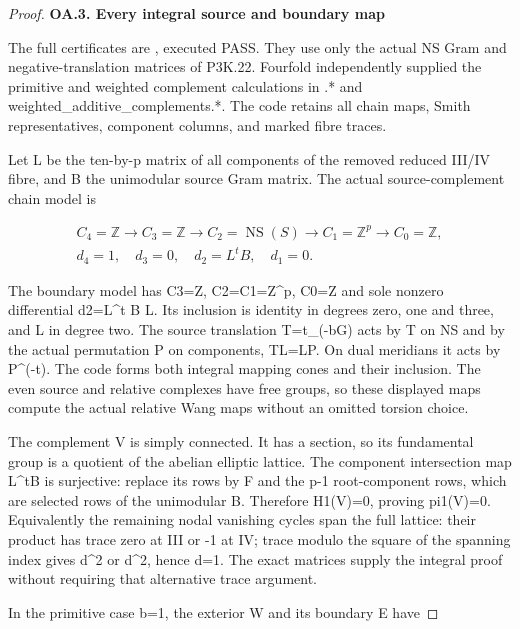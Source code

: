 \begin{proof}
\par

\medskip\noindent\textbf{OA.3. Every integral source and boundary map}

The full certificates are
, executed PASS.
They use only the actual NS Gram and negative-translation matrices
of P3K.22. Fourfold independently supplied the primitive and
weighted complement calculations in
.* and
weighted\_additive\_complements.*. The code retains all chain maps,
Smith representatives, component columns, and marked fibre traces.

Let L be the ten-by-p matrix of all components of the removed
reduced III/IV fibre, and B the unimodular source Gram matrix.
The actual source-complement chain model is

\[
\begin{gathered}C_4=\mathbb Z\longrightarrow C_3=\mathbb Z\longrightarrow C_2=\operatorname{NS}(S)\longrightarrow C_1=\mathbb Z^p\longrightarrow C_0=\mathbb Z,\\ d_4=1,\quad d_3=0,\quad d_2=L^tB,\quad d_1=0.\end{gathered}
\]

The boundary model has C3=Z, C2=C1=Z\^{}p, C0=Z and sole
nonzero differential d2=L\^{}t B L. Its inclusion is identity
in degrees zero, one and three, and L in degree two.
The source translation T=t\_(-bG) acts by T on NS and by
the actual permutation P on components, TL=LP. On dual
meridians it acts by P\^{}(-t). The code forms both integral
mapping cones and their inclusion. The even source and relative
complexes have free groups, so these displayed maps compute
the actual relative Wang maps without an omitted torsion choice.

The complement V is simply connected. It has a section, so its
fundamental group is a quotient of the abelian elliptic lattice.
The component intersection map L\^{}tB is surjective: replace its
rows by F and the p-1 root-component rows, which are selected
rows of the unimodular B. Therefore H1(V)=0, proving pi1(V)=0.
Equivalently the remaining nodal vanishing cycles span the full
lattice: their product has trace zero at III or -1 at IV;
trace modulo the square of the spanning index gives d\^{}2 or
d\^{}2, hence d=1. The exact matrices supply the integral proof
without requiring that alternative trace argument.

In the primitive case b=1, the exterior W and its boundary E have


\end{proof}

